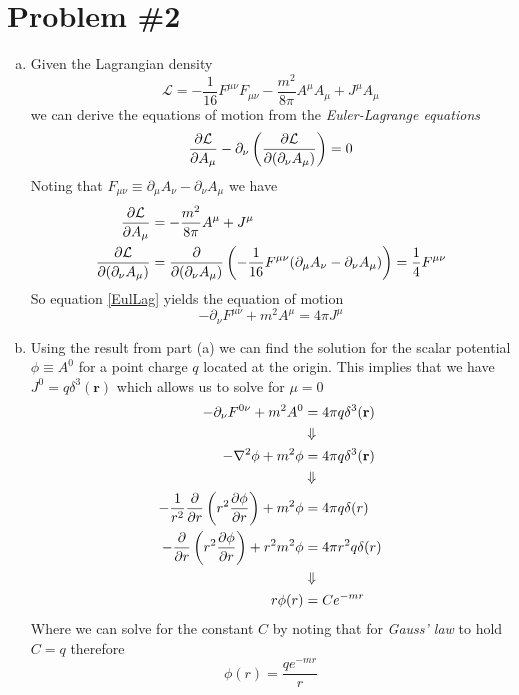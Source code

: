 \documentclass[11pt]{article}
\numberwithin{equation}{section}
\begin{document}
\section{Problem \#2}
\begin{enumerate}[(a)]
\item
    Given the Lagrangian density
    \begin{equation}
        \mathcal{L} = -\frac{1}{16}F^{\mu\nu}F_{\mu\nu} - \frac{m^2}{8\pi}A^{\mu}A_{\mu}+J^{\mu}A_{\mu}
        \label{LagDen}
    \end{equation}
    we can derive the equations of motion from the \emph{Euler-Lagrange equations}
    \begin{equation}
        \frac{\partial{\mathcal{L}}}{\partial{A_{\mu}}} - \partial_{\nu}\left(\frac{\partial{\mathcal{L}}}{\partial{(\partial_{\nu}A_{\mu})}}\right) = 0
        \label{EulLag}
    \end{equation}
    Noting that $F_{\mu\nu}\equiv\partial_{\mu}A_{\nu}-\partial_{\nu}A_{\mu}$ we have
    \begin{align*}
        \frac{\partial{\mathcal{L}}}{\partial{A_{\mu}}} &= -\frac{m^2}{8\pi}A^{\mu} + J^{\mu}\\
        \frac{\partial{\mathcal{L}}}{\partial{(\partial_{\nu}A_{\mu})}} &= \frac{\partial{}}{\partial{(\partial_{\nu}A_{\mu})}}\left(-\frac{1}{16}F^{\mu\nu}(\partial_{\mu}A_{\nu}-\partial_{\nu}A_{\mu})\right) = \frac{1}{4}F^{\mu\nu}
    \end{align*}
    So equation \ref{EulLag} yields the equation of motion
    $$-\partial_{\nu}F^{\mu\nu} + m^2A^{\mu} = 4\pi{J^{\mu}}$$

\item
    Using the result from part (a) we can find the solution for the scalar potential $\phi\equiv{A^{0}}$ for a point
    charge $q$ located at the origin. This implies that we have $J^{0} = q\delta^{3}(\mathbf{r})$ which allows us to 
    solve for $\mu=0$
    \begin{align*}
        -\partial_{\nu}F^{0\nu} + m^2A^{0} &= 4\pi q\delta^{3}(\mathbf{r})\\
                                           &\Downarrow\\
        -\bold\nabla^2\phi + m^2\phi &= 4\pi q\delta^{3}(\mathbf{r})\\
                                           &\Downarrow\\
        -\frac{1}{r^2}\frac{\partial{}}{\partial{r}}\left(r^2\frac{\partial{\phi}}{\partial{r}}\right) + m^2\phi &= 4\pi q\delta(r)\\
        -\frac{\partial{}}{\partial{r}}\left(r^2\frac{\partial{\phi}}{\partial{r}}\right) + r^2m^2\phi &= 4\pi r^2q\delta(r)\\
                                           &\Downarrow\\
                                  r\phi(r) &= Ce^{-mr}
    \end{align*}
    Where we can solve for the constant $C$ by noting that for \emph{Gauss' law} to hold $C=q$ therefore
    $$\phi(r) = \frac{qe^{-mr}}{r}$$

\end{enumerate}
\end{document}
